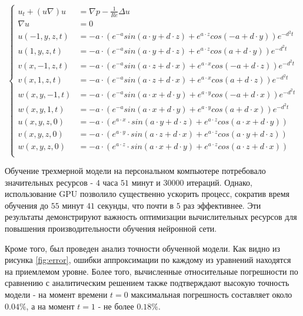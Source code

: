 \begin{equation}
    \begin{cases}
        u_t + (u\nabla)u &= \nabla p-\frac{1}{Re} \Delta u \\
        \nabla u         &= 0 \\
        u(- 1, y, z, t)  &= -a \cdot (e^{-a} sin(a \cdot y + d \cdot z) + e^{a \cdot z}cos(-a + d \cdot y)) e^{-d^2t} \\
        u(1, y, z, t)    &= -a \cdot (e^{-a} sin(a \cdot y + d \cdot z) + e^{a \cdot z} cos(a + d \cdot y)) e^{-d^2t} \\
        v(x, - 1, z, t)  &= -a \cdot (e^{-a} sin(a \cdot z + d \cdot x) + e^{a \cdot x}cos(-a + d \cdot z)) e^{-d^2t} \\
        v(x, 1, z, t)    &= -a \cdot (e^{-a} sin(a \cdot z + d \cdot x) + e^{a \cdot x} cos(a + d \cdot z)) e^{-d^2t} \\
        w(x, y, - 1, t)  &= -a \cdot (e^{-a} sin(a \cdot x + d \cdot y) + e^{a \cdot y}cos(-a + d \cdot x)) e^{-d^2t} \\
        w(x, y, 1, t)    &= -a \cdot (e^{-a} sin(a \cdot x + d \cdot y) + e^{a \cdot y} cos(a + d \cdot x)) e^{-d^2t} \\

        u(x, y, z, 0)    &= -a \cdot (e^{a \cdot x} \cdot sin(a \cdot y + d \cdot z) + e^{a \cdot z} cos(a \cdot x + d \cdot y)) \\
        v(x, y, z, 0)    &= -a \cdot (e^{a \cdot y} \cdot sin(a \cdot z + d \cdot x) + e^{a \cdot z} cos(a \cdot y + d \cdot z)) \\
        w(x, y, z, 0)    &= -a \cdot (e^{a \cdot z} \cdot sin(a \cdot x + d \cdot y) + e^{a \cdot z} cos(a \cdot z + d \cdot x)) \\
    \end{cases}
\end{equation}

Обучение трехмерной модели на персональном компьютере потребовало значительных ресурсов - $4$ часа $51$ минут и $30000$
итераций. Однако, использование GPU позволило существенно ускорить процесс, сократив время обучения до $55$ минут $41$
секунды, что почти в $5$ раз эффективнее. Эти результаты демонстрируют важность оптимизации вычислительных ресурсов
для повышения производительности обучения нейронной сети.

Кроме того, был проведен анализ точности обученной модели. Как видно из рисунка \ref{fig:error}, ошибки
аппроксимации по каждому из уравнений находятся на приемлемом уровне. Более того, вычисленные относительные погрешности
по сравнению с аналитическим решением также подтверждают высокую точность модели - на момент времени $t=0$ максимальная
погрешность составляет около $0.04\%$, а на момент $t=1$ - не более $0.18\%$.

